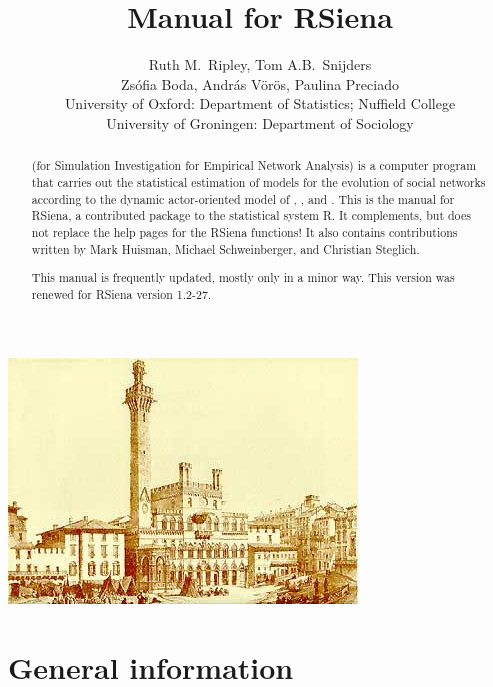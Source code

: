 \documentclass[a4paper,fleqn,11pt]{article}
\title{{\Huge Manual for \textsf{RSiena} } }
\author{\Large Ruth M.\ Ripley, Tom A.B.\ Snijders\\[1ex]
        \Large Zs\'{o}fia Boda, Andr\'{a}s V\"{o}r\"{o}s, Paulina Preciado  \\[4ex]
       {\large University of Oxford: Department of Statistics; Nuffield College}\\[1ex]
       {\large University of Groningen: Department of Sociology}\\[1ex]
    }
\newcommand{\+}{\, + \,}
\newcommand{\Rn}{{\sf R}}
\newcommand{\rs}{{\sf RSiena}}
\newcommand{\RS}{{\sf RSiena }}
\newcommand{\SI}{{\sf SIENA }}
\begin{document}

\maketitle

\vfill
\begin{center}
\includegraphics*[scale=3]{ilcampo.jpg}
\end{center}
\vfill

\begin{abstract}
\noindent \SI (for {\sf Simulation Investigation for Empirical
Network Analysis}) is a computer program that carries out the
statistical estimation of models for the evolution of social
networks according to the dynamic actor-oriented model of \citet{Snijders01,
Snijders05}, \citet*{SnijdersEA07}, and \citet*{SnijdersEA10a}.
This is the manual for \rs,
a contributed package to the statistical system \Rn.
It complements, but does not replace the help pages
for the \RS functions!
It also contains contributions written
by Mark Huisman, Michael Schweinberger, and Christian Steglich.

This manual is frequently updated, mostly only in a minor way.
This version was renewed for \RS version 1.2-27.
\end{abstract}




\vfill
\newpage
\tableofcontents
\newpage

\makeatletter
\def\@linkcolor{lc}
\makeatother


\section{General information}
\end{document}
